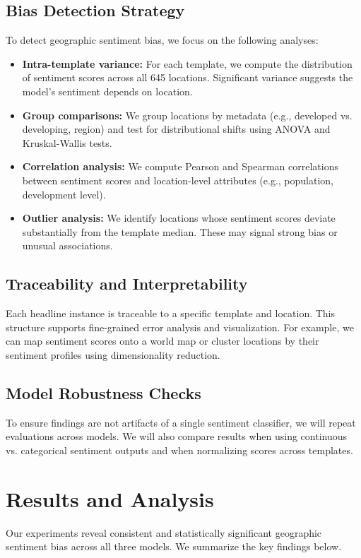 \documentclass{article} %
\begin{document}
\subsection{Bias Detection Strategy}
To detect geographic sentiment bias, we focus on the following analyses:
\begin{itemize}
  \item \textbf{Intra-template variance:} For each template, we compute the distribution of sentiment scores across all 645 locations. Significant variance suggests the model’s sentiment depends on location.  
  \item \textbf{Group comparisons:} We group locations by metadata (e.g., developed vs. developing, region) and test for distributional shifts using ANOVA and Kruskal-Wallis tests.  
  \item \textbf{Correlation analysis:} We compute Pearson and Spearman correlations between sentiment scores and location-level attributes (e.g., population, development level).  
  \item \textbf{Outlier analysis:} We identify locations whose sentiment scores deviate substantially from the template median. These may signal strong bias or unusual associations.  
\end{itemize}

\subsection{Traceability and Interpretability}
Each headline instance is traceable to a specific template and location. This structure supports fine-grained error analysis and visualization. For example, we can map sentiment scores onto a world map or cluster locations by their sentiment profiles using dimensionality reduction.

\subsection{Model Robustness Checks}
To ensure findings are not artifacts of a single sentiment classifier, we will repeat evaluations across models. We will also compare results when using continuous vs. categorical sentiment outputs and when normalizing scores across templates.


\section{Results and Analysis}

Our experiments reveal consistent and statistically significant geographic sentiment bias across all three models. We summarize the key findings below.
\end{document}
